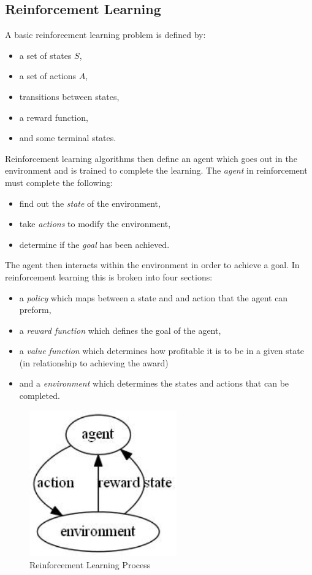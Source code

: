 \documentclass[conference]{IEEEtran}
\begin{document}
\subsection{Reinforcement Learning}
A basic reinforcement learning problem is defined by\cite{poliscuk_adaptive_2002}:
\begin{itemize}
    \item a set of states $S$,
    \item a set of actions $A$,
    \item transitions between states,
    \item a reward function,
    \item and some terminal states.
\end{itemize}
Reinforcement learning algorithms then define an agent which goes out in the environment and is trained to complete the learning. 
The \emph{agent} in reinforcement must complete the following\cite{poliscuk_adaptive_2002}:
\begin{itemize}
	\item find out the \emph{state} of the environment,
	\item take \emph{actions} to modify the environment,
	\item determine if the \emph{goal} has been achieved.
\end{itemize}
The agent then interacts within the environment in order to achieve a goal.  In reinforcement learning this is broken into four sections:
\begin{itemize}
	\item a \emph{policy} which maps between a state and and action that the agent can preform,
	\item a \emph{reward function} which defines the goal of the agent,
	\item a \emph{value function} which determines how profitable it is to be in a given state (in relationship to achieving the award)
	\item and a \emph{environment} which determines the states and actions that can be completed.
\end{itemize}

\begin{figure}
\centering
\includegraphics[width=2.5in]{RLDiagram}
\caption{Reinforcement Learning Process}
\label{RLDiagram}
\end{figure}
\end{document}

